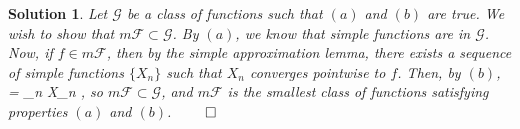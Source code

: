 \documentclass{article} %
\def\eQb#1\eQe{\begin{eqnarray*}#1\end{eqnarray*}}
\theoremstyle{quest}
\newtheorem*{solution}{Solution}
\begin{document}
\begin{solution}
\bigskip

Let $\mathscr{G}$ be a class of functions such that $(a)$ and $(b)$ are true. 
We wish to show that $m\mathscr{F} \subset \mathscr{G}$. By $(a)$, we know that
simple functions are in $\mathscr{G}$. Now, if $f \in m\mathscr{F}$, then
by the simple approximation lemma, there exists a sequence of simple functions
$\{X_n \}$ such that $X_n$ converges pointwise to $f$. Then, by $(b)$,
\eQb
f = \limsup_{n \to \infty} X_n \in {},
\eQe 
so $m\mathscr{F} \subset \mathscr{G}$, and $m\mathscr{F}$ is the smallest class
of functions satisfying properties $(a)$ and $(b)$. \hfill $\qed$

\end{solution}
\newpage
\end{document}
